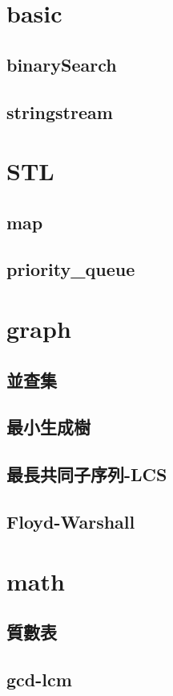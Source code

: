 \section{basic}
    \subsection{binarySearch}
        
    \subsection{stringstream}
        
\section{STL}
    \subsection{map}
        
    \subsection{priority_queue}
        
\section{graph}
    \subsection{並查集}
        
    \subsection{最小生成樹}
        
    \subsection{最長共同子序列-LCS}
        
    \subsection{Floyd-Warshall}
        
\section{math}
    \subsection{質數表}
        
    \subsection{gcd-lcm}
        